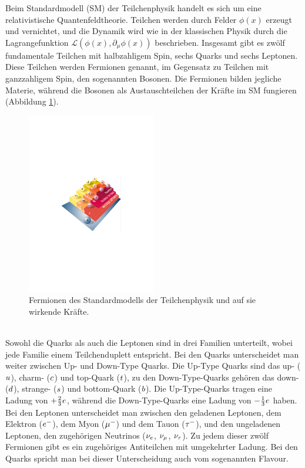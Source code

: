 Beim Standardmodell (SM) der Teilchenphysik handelt es sich um eine relativistische Quantenfeldtheorie. Teilchen werden durch Felder $\phi(x)$ erzeugt und vernichtet, und die Dynamik wird wie in der klassischen Physik durch die Lagrangefunktion $\mathcal{L}(\phi(x),\partial_\mu\phi(x))$ beschrieben. Insgesamt gibt es zwölf fundamentale Teilchen mit halbzahligem Spin, sechs Quarks und sechs Leptonen. Diese Teilchen werden Fermionen genannt, im Gegensatz zu Teilchen mit ganzzahligem Spin, den sogenannten Bosonen. Die Fermionen bilden jegliche Materie, während die Bosonen als Austauschteilchen der Kräfte im SM fungieren (Abbildung \ref{fig:SM_teilchen}).
\begin{figure}[htbp]
	\centering
		\includegraphics[width=0.5\textwidth]{fig/SM_teilchen.pdf}
	\caption{Fermionen des Standardmodells der Teilchenphysik und auf sie wirkende Kräfte. \cite{SM_teilchen}}
	\label{fig:SM_teilchen} 
\end{figure}\\
Sowohl die Quarks als auch die Leptonen sind in drei Familien unterteilt, wobei jede Familie einem Teilchenduplett entspricht. Bei den Quarks unterscheidet man weiter zwischen Up- und  Down-Type Quarks. Die Up-Type Quarks sind das up- (${u}$), charm- (${c}$) und top-Quark (${t}$), zu den Down-Type-Quarks gehören das down- (${d}$), strange- (${s}$) und bottom-Quark (${b}$). Die Up-Type-Quarks tragen eine Ladung von $+\tfrac{2}{3}{e}$, während die Down-Type-Quarks eine Ladung von $-\tfrac{1}{3}{e}$ haben.\\
Bei den Leptonen unterscheidet man zwischen den geladenen Leptonen, dem Elektron (${e^-}$), dem Myon (${\mu^-}$) und dem Tauon (${\tau^-}$), und den ungeladenen Leptonen, den zugehörigen Neutrinos (${{\nu}_e}$, ${{\nu}_\mu}$, ${{\nu}_\tau}$). Zu jedem dieser zwölf Fermionen gibt es ein zugehöriges Antiteilchen mit umgekehrter Ladung. Bei den Quarks spricht man bei dieser Unterscheidung auch vom sogenannten Flavour.\\
